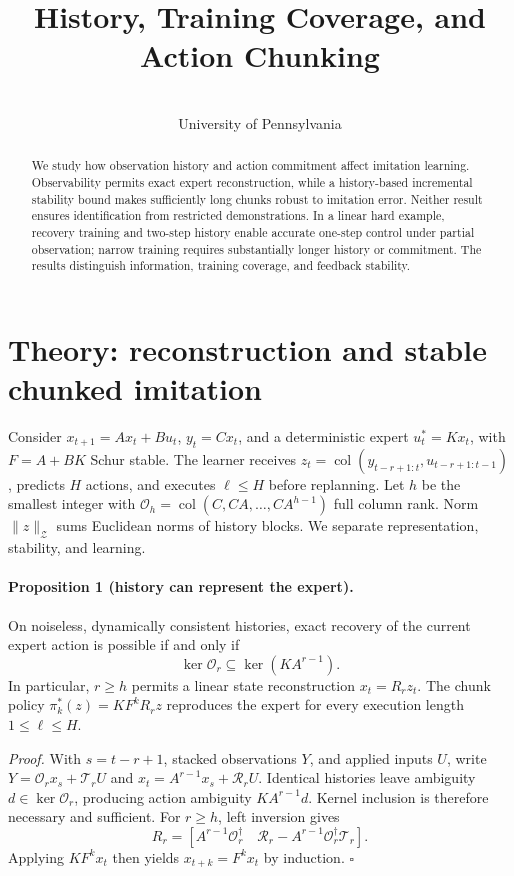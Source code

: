 \documentclass{l4dc2026}
\title[History, Coverage, and Chunking]{History, Training Coverage, and Action Chunking}
\author{\Name{Nihar Ballamudi}\and\Name{Kyle Horton}\\\addr University of Pennsylvania}
\newcommand{\norm}[1]{\lVert#1\rVert}
\newcommand{\col}{\operatorname{col}}
\begin{document}
\maketitle
\begin{abstract}
We study how observation history and action commitment affect imitation learning. Observability permits exact expert reconstruction, while a history-based incremental stability bound makes sufficiently long chunks robust to imitation error. Neither result ensures identification from restricted demonstrations. In a linear hard example, recovery training and two-step history enable accurate one-step control under partial observation; narrow training requires substantially longer history or commitment. The results distinguish information, training coverage, and feedback stability.
\end{abstract}

\section{Theory: reconstruction and stable chunked imitation}
Consider $x_{t+1}=Ax_t+Bu_t$, $y_t=Cx_t$, and a deterministic expert $u_t^*=Kx_t$, with $F=A+BK$ Schur stable. The learner receives $z_t=\col(y_{t-r+1:t},u_{t-r+1:t-1})$, predicts $H$ actions, and executes $\ell\le H$ before replanning. Let $h$ be the smallest integer with $\mathcal O_h=\col(C,CA,\ldots,CA^{h-1})$ full column rank. Norm $\norm{z}_{\mathcal Z}$ sums Euclidean norms of history blocks. We separate representation, stability, and learning.

\paragraph{Proposition 1 (history can represent the expert).}
On noiseless, dynamically consistent histories, exact recovery of the current expert action is possible if and only if
\[
\ker\mathcal O_r\subseteq\ker(KA^{r-1}).
\]
In particular, $r\ge h$ permits a linear state reconstruction $x_t=R_rz_t$. The chunk policy $\pi_k^*(z)=KF^kR_rz$ reproduces the expert for every execution length $1\le\ell\le H$.

\emph{Proof.} With $s=t-r+1$, stacked observations $Y$, and applied inputs $U$, write $Y=\mathcal O_rx_s+\mathcal T_rU$ and $x_t=A^{r-1}x_s+\mathcal R_rU$. Identical histories leave ambiguity $d\in\ker\mathcal O_r$, producing action ambiguity $KA^{r-1}d$. Kernel inclusion is therefore necessary and sufficient. For $r\ge h$, left inversion gives
\[
R_r=[A^{r-1}\mathcal O_r^\dagger\quad
\mathcal R_r-A^{r-1}\mathcal O_r^\dagger\mathcal T_r].
\]
Applying $KF^kx_t$ then yields $x_{t+k}=F^kx_t$ by induction. $\square$
\end{document}
